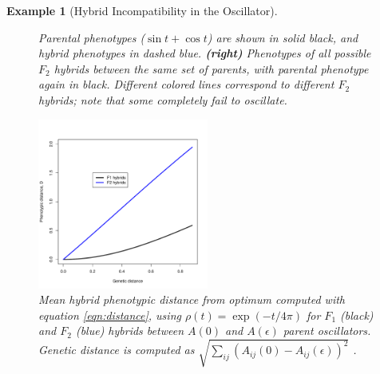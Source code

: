 \documentclass{article}
\newcommand{\plr}[1]{\todo[color=blue!25]{#1}}
\newcommand{\plri}[1]{{\color{blue}\it #1}}
\newcommand{\plr}[1]{{\color{blue}\it #1}}
\newcommand{\plri}[1]{\plr{#1}}
\newcommand{\1}{\mathbbm{1}}
\newtheorem{example}{Example}
\begin{document}
\begin{example}[Hybrid Incompatibility in the Oscillator]
\begin{figure}[H]
{    %
    Parental phenotypes ($\sin t + \cos t$) are shown in solid black, and hybrid phenotypes in dashed blue.
    \textbf{(right)} Phenotypes of all possible $F_2$ hybrids between the same set of parents,
    with parental phenotype again in black.
    Different colored lines correspond to different $F_2$ hybrids;
    note that some completely fail to oscillate.
  } \label{fig:hybs}
\end{figure}

  \begin{figure}[H]
    \centering
    \includegraphics[width=0.5\textwidth]{examples/F2_vs_F1_divergence_tau0}
    \caption{Mean hybrid phenotypic distance from optimum computed with equation \ref{eqn:distance}, using $\rho(t) = \exp(-t/4\pi)$
    for $F_1$ (black) and $F_2$ (blue) hybrids between $A(0)$ and $A(\epsilon)$ parent oscillators. Genetic distance is computed as 
    $\sqrt{\sum_{ij} (A_{ij}(0) - A_{ij}(\epsilon))^2}$
    .}
    \label{fig:osc_incompat}
  \end{figure}
\end{example}
\end{document}
